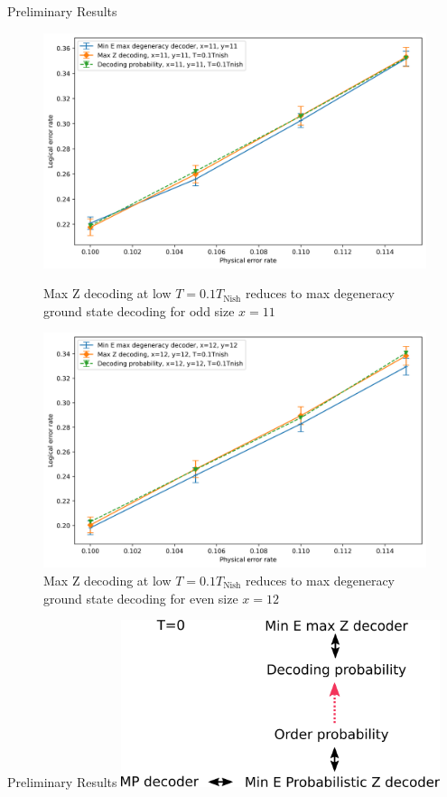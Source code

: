 \documentclass{dfki}
\begin{document}
\begin{frame}{Preliminary Results}
	\begin{figure}[h!]
		\centering
		\begin{minipage}{0.45\textwidth}
			\centering
			\includegraphics[width=\textwidth]{fig/MineEMaxG_DecProb01_LowTMaxZ_x11.png}
			\caption{Max Z decoding at low $T=0.1T_{\text{Nish}}$ reduces to max degeneracy ground state decoding for odd size $x=11$}
		\end{minipage} \hfill
		\begin{minipage}{0.45\textwidth}
			\centering
			\includegraphics[width=\textwidth]{fig/MineEMaxG_DecProb01_LowTMaxZ_x12.png}
			\caption{Max Z decoding at low $T=0.1T_{\text{Nish}}$ reduces to max degeneracy ground state decoding for even size $x=12$}
		\end{minipage}
	\end{figure}
\end{frame}

\begin{frame}{Preliminary Results}
	\center
	\includegraphics[width=0.7\textwidth]{fig/Optimization_potential.png}
\end{frame}
\end{document}
